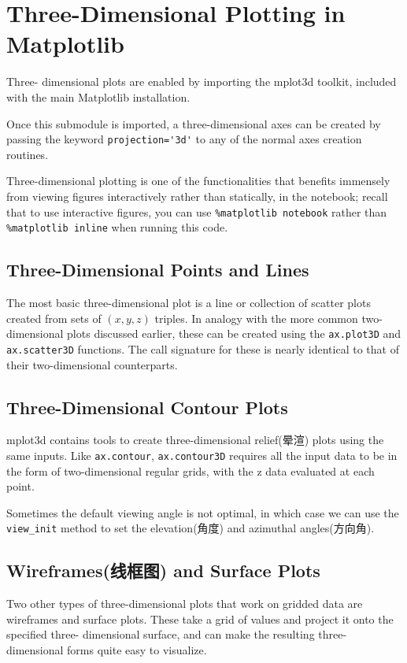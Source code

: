 \chapter{Three-Dimensional Plotting in Matplotlib\label{Ch35}}
Three-
dimensional plots are enabled by importing the mplot3d toolkit, included with the
main Matplotlib installation.

Once this submodule is imported, a three-dimensional axes can be created by passing
the keyword \verb|projection='3d'| to any of the normal axes creation routines.

Three-dimensional plotting is one of the functionalities that
benefits immensely from viewing figures interactively rather than statically, in the
notebook; recall that to use interactive figures, you can use \verb|%matplotlib notebook|
rather than \verb|%matplotlib inline| when running this code.

\section{Three-Dimensional Points and Lines}
The most basic three-dimensional plot is a line or collection of scatter plots created
from sets of $(x, y, z)$ triples. In analogy with the more common two-dimensional plots
discussed earlier, these can be created using the \verb|ax.plot3D| and \verb|ax.scatter3D| functions. The call signature for these is nearly identical to that of their two-dimensional
counterparts.

\section{Three-Dimensional Contour Plots}
mplot3d contains tools to
create three-dimensional relief(晕渲) plots using the same inputs. Like \verb|ax.contour|, \verb|ax.contour3D| requires all the input data to be in the form of two-dimensional regular grids,
with the z data evaluated at each point.

Sometimes the default viewing angle is not optimal, in which case we can use the
\verb|view_init| method to set the elevation(角度) and azimuthal angles(方向角).

\section{Wireframes(线框图) and Surface Plots}
Two other types of three-dimensional plots that work on gridded data are wireframes
and surface plots. These take a grid of values and project it onto the specified three-
dimensional surface, and can make the resulting three-dimensional forms quite easy
to visualize.

